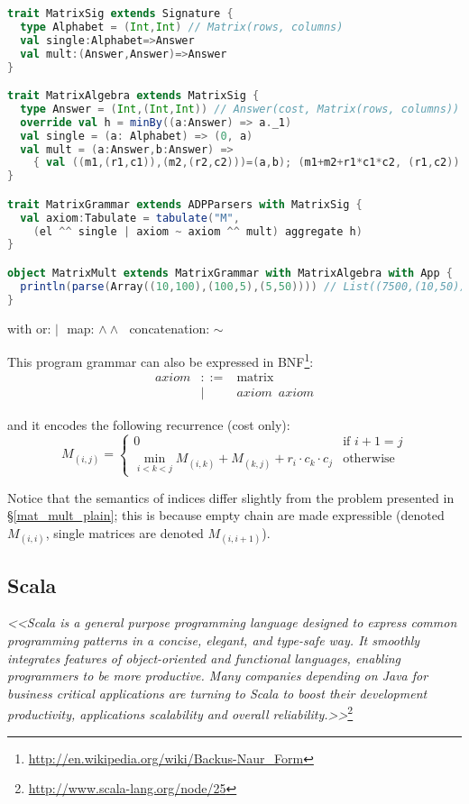 \begin{lstlisting}[language=Scala,caption={Matrix chain mulitiplication DSL implementation}]
trait MatrixSig extends Signature {
  type Alphabet = (Int,Int) // Matrix(rows, columns)
  val single:Alphabet=>Answer
  val mult:(Answer,Answer)=>Answer
}

trait MatrixAlgebra extends MatrixSig {
  type Answer = (Int,(Int,Int)) // Answer(cost, Matrix(rows, columns))
  override val h = minBy((a:Answer) => a._1)
  val single = (a: Alphabet) => (0, a)
  val mult = (a:Answer,b:Answer) =>
    { val ((m1,(r1,c1)),(m2,(r2,c2)))=(a,b); (m1+m2+r1*c1*c2, (r1,c2)) }
}

trait MatrixGrammar extends ADPParsers with MatrixSig {
  val axiom:Tabulate = tabulate("M",
    (el ^^ single | axiom ~ axiom ^^ mult) aggregate h)
}

object MatrixMult extends MatrixGrammar with MatrixAlgebra with App {
  println(parse(Array((10,100),(100,5),(5,50)))) // List((7500,(10,50)))
}
\end{lstlisting}
\begin{center}\vspace{-18pt} with or: $|\,\,$ map: $\land\land\,\,$ concatenation: $\sim$ \end{center}

This program grammar can also be expressed in BNF\footnote{\url{http://en.wikipedia.org/wiki/Backus-Naur\_Form}}:
\[\begin{array}{lrl}
axiom &::=& \text{matrix} \\
 &|& axiom \,\,\, axiom
\end{array}\]

and it encodes the following recurrence (cost only):
	\[M_{(i,j)}=\left\{\begin{array}{ll}
		0 & \text{if } i+1= j\\
		\min_{i<k<j} M_{(i,k)}+M_{(k,j)}+r_i \cdot c_k \cdot c_j & \text{otherwise}
	\end{array}\right. \]

Notice that the semantics of indices differ slightly from the problem presented in \S\ref{mat_mult_plain}; this is because empty chain are made expressible (denoted $M_{(i,i)}$, single matrices are denoted $M_{(i,i+1)}$).

\newpage
\subsection{Scala} \label{bg_scala}
\textit{<<Scala is a general purpose programming language designed to express common programming patterns in a concise, elegant, and type-safe way. It smoothly integrates features of object-oriented and functional languages, enabling programmers to be more productive. Many companies depending on Java for business critical applications are turning to Scala to boost their development productivity, applications scalability and overall reliability.>>}\footnote{\url{http://www.scala-lang.org/node/25}}

